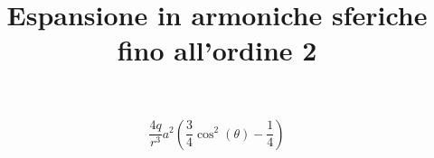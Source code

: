 \documentclass[11pt]{article}
\title{Espansione in armoniche sferiche fino all'ordine 2}
\begin{document}
 
\maketitle 


\[ \frac{4 q}{r^{3}} a^{2} \left(\frac{3}{4} \cos^{2}{\left (\theta \right )} - \frac{1}{4}\right) \] 
\end{document}
